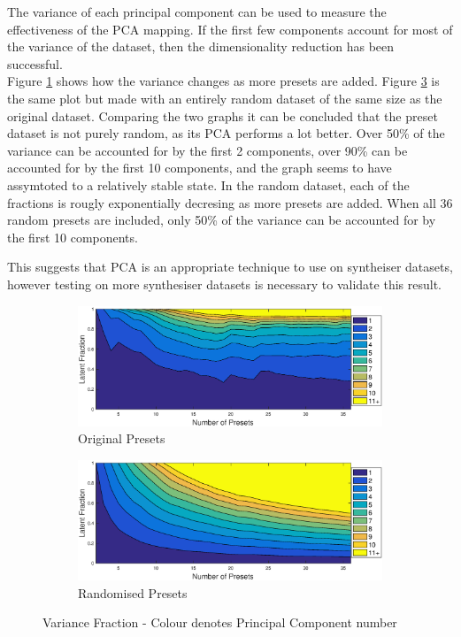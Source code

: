 \documentclass[11pt, oneside]{report}   	%
\begin{document}
The variance of each principal component can be used to measure the effectiveness of the PCA mapping. If the first few components account for most of the variance of the dataset, then the dimensionality reduction has been successful.\\
Figure \ref{fig:LatentOriginal} shows how the variance changes as more presets are added. Figure \ref{fig:LatentRandom} is the same plot but made with an entirely random dataset of the same size as the original dataset. Comparing the two graphs it can be concluded that the preset dataset is not purely random, as its PCA performs a lot better. Over 50\% of the variance can be accounted for by the first 2 components,  over 90\% can be accounted for by the first 10 components, and the graph seems to have assymtoted to a relatively stable state. In the random dataset, each of the fractions is rougly exponentially decresing as more presets are added. When all 36 random presets are included, only 50\% of the variance can be accounted for by the first 10 components. 

This suggests that PCA is an appropriate technique to use on syntheiser datasets, however testing on more synthesiser datasets is necessary to validate this result.
\begin{figure}
	\hspace{-40pt}
	\begin{subfigure}{3.5in}
		\includegraphics[width = \textwidth]{LatentFraction.eps}
		\caption{Original Presets}
		\label{fig:LatentOriginal}
	\end{subfigure} 
%
	\begin{subfigure}{3.5in}
		\includegraphics[width = \textwidth]{LatentFractionRandom.eps}
		\caption{Randomised Presets}
		\label{fig:LatentRandom}
	\end{subfigure}
	\caption{Variance Fraction - Colour denotes Principal Component number}
\end{figure}
\end{document}
